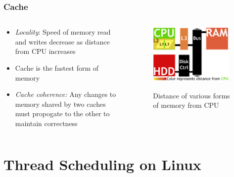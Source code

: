 \documentclass{beamer}
\newcommand{\linespace}{\vskip 0.25cm}
\begin{document}
\begin{frame}
\frametitle{Cache}

\begin{columns}
\begin{column}{0.5\textwidth}
\begin{itemize}
	\item \emph{Locality}: Speed of memory read and writes decrease as distance from CPU increases
	\item Cache is the fastest form of memory
	
	\linespace
	
	\item \emph{Cache coherence:} Any changes to memory shared by two caches must propogate to the other to maintain correctness
\end{itemize}

\end{column}
\begin{column}{0.5\textwidth}
		\begin{figure}
		\includegraphics[width=0.95\textwidth]{Illustrations/CacheAbstract}
		\label{fig:domains}
		\caption{Distance of various forms of memory from CPU}
		\end{figure}
	\end{column}
\end{columns}
\end{frame}


\section[Thread Scheduling]{Thread Scheduling on Linux}
\end{document}
